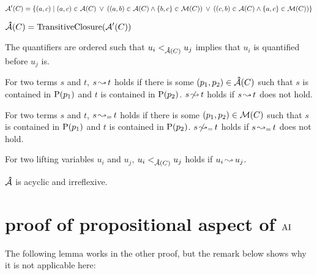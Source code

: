 \documentclass[,%
	paper=a4,%
	DIV14, %
	twoside=false,%
	liststotoc,
	bibtotoc,
	draft=false,%
	numbers=noendperiod
]{scrartcl}
\begin{document}
$\operatorname{\mathcal{A}}'(C) = \{ (a,c) \mid  (a,c) \in  \operatorname{\mathcal{A}}(C) \;\,{\lor}\;\, ((a,b) \in \operatorname{\mathcal{A}}(C) \land \{b, c\} \in \operatorname{\operatorname{\mathcal{M}}}(C) ) \;\,{\lor}\;\,  ((c, b) \in \operatorname{\mathcal{A}}(C) \land \{a, c\} \in \operatorname{\operatorname{\mathcal{M}}}(C)) \}$


$\operatorname{{\mathcal{\bm{\hat}A}}}(C) = \operatorname{TransitiveClosure}(\operatorname{\mathcal{A}}'(C))$

The quantifiers are ordered such that $u_i <_{\operatorname{{\mathcal{\bm{\hat}A}}}(C)} u_j$ implies that $u_i$ is quantified before $u_j$ is.




\begin{defi}
	For two terms $s$ and $t$, $s\operatorname{\leadsto} t$ holds if there is some $(p_1, p_2) \in \operatorname{{\mathcal{\bm{\hat}A}}}(C)$ such that $s$ is contained in $\operatorname{{\operatorname P}}(p_1)$ and $t$ is contained in $\operatorname{{\operatorname P}}(p_2)$. $s\operatorname{\not\leadsto} t$ holds if $s\operatorname{\leadsto} t$ does not hold.

	For two terms $s$ and $t$, $s\operatorname{\leadsto_=} t$ holds if there is some $(p_1, p_2) \in \operatorname{\mathcal{M}}(C)$ such that $s$ is contained in $\operatorname{{\operatorname P}}(p_1)$ and $t$ is contained in $\operatorname{{\operatorname P}}(p_2)$.
 $s\operatorname{\not\leadsto_=} t$ holds if $s\operatorname{\leadsto_=} t$ does not hold.
\end{defi}

\begin{defi}
	For two lifting variables $u_i$ and $u_j$, $u_i <_{\operatorname{{\mathcal{\bm{\hat}A}}}(C)} u_j$ holds if $u_i \operatorname{\leadsto} u_j$.
\end{defi}

\begin{conj}
	$\operatorname{{\mathcal{\bm{\hat}A}}}$ is acyclic and irreflexive.
\end{conj}


\clearpage

\section{proof of propositional aspect of $\operatorname{AI}$}

The following lemma works in the other proof, but the remark below shows why it is not applicable here:
\end{document}
